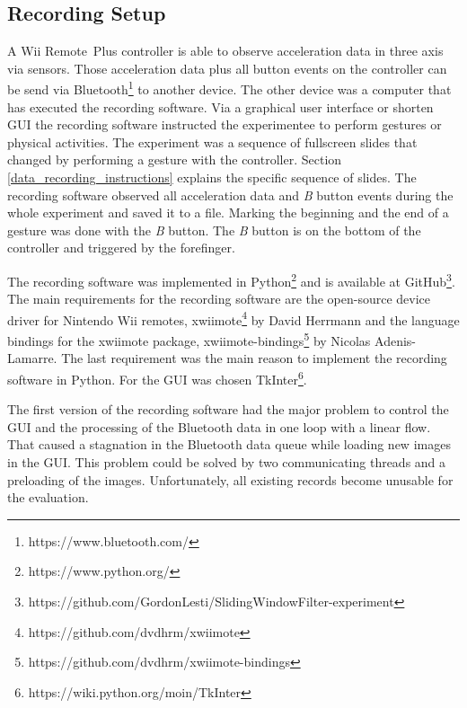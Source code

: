 \subsection{Recording Setup} \label{recording_setup}
A Wii Remote\texttrademark~Plus controller is able to observe acceleration data in three axis via sensors. Those
acceleration data plus all button events on the controller can be send via
Bluetooth\footnote{https://www.bluetooth.com/} to another device. The other device was a computer that has executed the
recording software. Via a graphical user interface or shorten GUI the recording software instructed the experimentee to
perform gestures or physical activities. The experiment was a sequence of fullscreen slides that changed by performing a
gesture with the controller. Section \ref{data_recording_instructions} explains the specific sequence of slides. The
recording software observed all acceleration data and \textit{B} button events during the whole experiment and saved it
to a file. Marking the beginning and the end of a gesture was done with the \textit{B} button. The \textit{B}
button is on the bottom of the controller and triggered by the forefinger.

The recording software was implemented in Python\footnote{https://www.python.org/} and is available at
GitHub\footnote{https://github.com/GordonLesti/SlidingWindowFilter-experiment}. The main requirements for the recording
software are the open-source device driver for Nintendo Wii remotes,
xwiimote\footnote{https://github.com/dvdhrm/xwiimote} by David Herrmann and the language bindings for the xwiimote
package, xwiimote-bindings\footnote{https://github.com/dvdhrm/xwiimote-bindings} by Nicolas Adenis-Lamarre. The last
requirement was the main reason to implement the recording software in Python. For the GUI was chosen
TkInter\footnote{https://wiki.python.org/moin/TkInter}.

The first version of the recording software had the major problem to control the GUI and the
processing of the Bluetooth data in one loop with a linear flow. That caused a stagnation in the Bluetooth data queue
while loading new images in the GUI. This problem could be solved by two communicating threads and a preloading of the
images. Unfortunately, all existing records become unusable for the evaluation.


